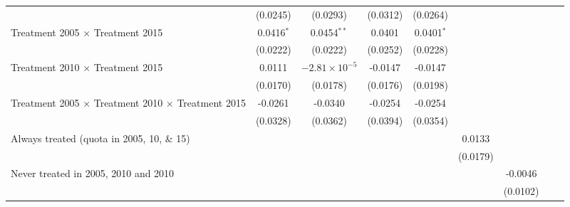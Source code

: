 \begin{tabular}{lcccccccc}
                                                                       & (0.0245)       & (0.0293)               & (0.0312)      & (0.0264)      &               &                       &                       &   \\   
   Treatment 2005 $\times $ Treatment 2015                             & 0.0416$^{*}$   & 0.0454$^{**}$          & 0.0401        & 0.0401$^{*}$  &               &                       &                       &   \\   
                                                                       & (0.0222)       & (0.0222)               & (0.0252)      & (0.0228)      &               &                       &                       &   \\   
   Treatment  2010 $\times $ Treatment 2015                            & 0.0111         & $-2.81\times 10^{-5}$  & -0.0147       & -0.0147       &               &                       &                       &   \\   
                                                                       & (0.0170)       & (0.0178)               & (0.0176)      & (0.0198)      &               &                       &                       &   \\   
   Treatment 2005 $\times $ Treatment  2010 $\times $ Treatment 2015   & -0.0261        & -0.0340                & -0.0254       & -0.0254       &               &                       &                       &   \\   
                                                                       & (0.0328)       & (0.0362)               & (0.0394)      & (0.0354)      &               &                       &                       &   \\   
   Always treated (quota in 2005, 10, \& 15)                           &                &                        &               &               & 0.0133        &                       &                       &   \\   
                                                                       &                &                        &               &               & (0.0179)      &                       &                       &   \\   
   Never treated in 2005, 2010 and 2010                                &                &                        &               &               &               & -0.0046               &                       &   \\   
                                                                       &                &                        &               &               &               & (0.0102)              &                       &   \\   

\end{tabular}
